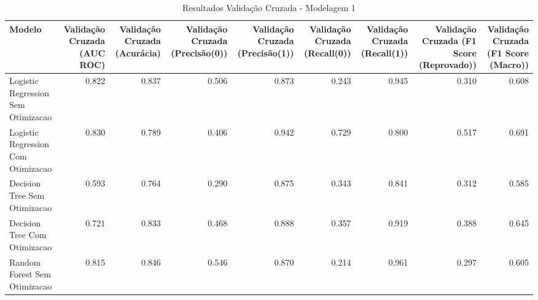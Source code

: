 \begin{table}[H] %
    \centering
    \caption{Resultados Validação Cruzada - Modelagem 1}
    \label{tab:resultados_cv_modelagem_1}
    \renewcommand{\arraystretch}{1.25} %
    \begin{adjustwidth}{ -1in }{ -1in } %
    \centering %
    \small %
    \begin{tabular}{lrrrrrrrr}
\toprule
                            Modelo &  Validação Cruzada (AUC ROC) &  Validação Cruzada (Acurácia) &  Validação Cruzada (Precisão(0)) &  Validação Cruzada (Precisão(1)) &  Validação Cruzada (Recall(0)) &  Validação Cruzada (Recall(1)) &  Validação Cruzada (F1 Score (Reprovado)) &  Validação Cruzada (F1 Score (Macro)) \\
\midrule
Logistic Regression Sem Otimizacao &                        0.822 &                         0.837 &                            0.506 &                            0.873 &                          0.243 &                          0.945 &                                     0.310 &                                 0.608 \\
Logistic Regression Com Otimizacao &                        0.830 &                         0.789 &                            0.406 &                            0.942 &                          0.729 &                          0.800 &                                     0.517 &                                 0.691 \\
      Decision Tree Sem Otimizacao &                        0.593 &                         0.764 &                            0.290 &                            0.875 &                          0.343 &                          0.841 &                                     0.312 &                                 0.585 \\
      Decision Tree Com Otimizacao &                        0.721 &                         0.833 &                            0.468 &                            0.888 &                          0.357 &                          0.919 &                                     0.388 &                                 0.645 \\
      Random Forest Sem Otimizacao &                        0.815 &                         0.846 &                            0.546 &                            0.870 &                          0.214 &                          0.961 &                                     0.297 &                                 0.605 \\

\end{tabular}
\end{adjustwidth}
\end{table}
